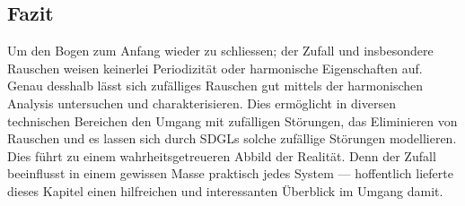 
\subsection{Fazit\label{brown:fazit}}

Um den Bogen zum Anfang wieder zu schliessen; der Zufall und insbesondere Rauschen weisen keinerlei Periodizität oder harmonische Eigenschaften auf. Genau desshalb lässt sich zufälliges Rauschen gut mittels der harmonischen Analysis untersuchen und charakterisieren. Dies ermöglicht in diversen technischen Bereichen den Umgang mit zufälligen Störungen, das Eliminieren von Rauschen und es lassen sich durch SDGLs solche zufällige Störungen modellieren. Dies führt zu einem wahrheitsgetreueren Abbild der Realität. Denn der Zufall beeinflusst in einem gewissen Masse praktisch jedes System --- hoffentlich lieferte dieses Kapitel einen hilfreichen und interessanten Überblick im Umgang damit.
